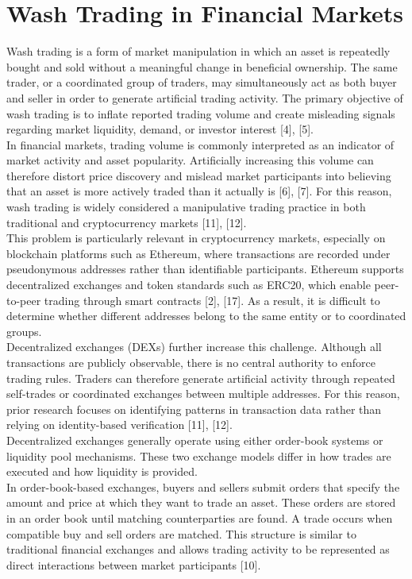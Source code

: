 \documentclass[language=english,thesis=bachelor,nosecondtitle,onesided,faculty=cb]{hsmw-thesis}
\begin{document}
	\section{Wash Trading in Financial Markets}
Wash trading is a form of market manipulation in which an asset is repeatedly bought and sold without a meaningful change in beneficial ownership. The same trader, or a coordinated group of traders, may simultaneously act as both buyer and seller in order to generate artificial trading activity. The primary objective of wash trading is to inflate reported trading volume and create misleading signals regarding market liquidity, demand, or investor interest [4], [5].\\
In financial markets, trading volume is commonly interpreted as an indicator of market activity and asset popularity. Artificially increasing this volume can therefore distort price discovery and mislead market participants into believing that an asset is more actively traded than it actually is [6], [7]. For this reason, wash trading is widely considered a manipulative trading practice in both traditional and cryptocurrency markets [11], [12].\\
This problem is particularly relevant in cryptocurrency markets, especially on blockchain platforms such as Ethereum, where transactions are recorded under pseudonymous addresses rather than identifiable participants. Ethereum supports decentralized exchanges and token standards such as ERC20, which enable peer-to-peer trading through smart contracts [2], [17]. As a result, it is difficult to determine whether different addresses belong to the same entity or to coordinated groups.\\
Decentralized exchanges (DEXs) further increase this challenge. Although all transactions are publicly observable, there is no central authority to enforce trading rules. Traders can therefore generate artificial activity through repeated self-trades or coordinated exchanges between multiple addresses. For this reason, prior research focuses on identifying patterns in transaction data rather than relying on identity-based verification [11], [12].\\
Decentralized exchanges generally operate using either order-book systems or liquidity pool mechanisms. These two exchange models differ in how trades are executed and how liquidity is provided.\\
In order-book-based exchanges, buyers and sellers submit orders that specify the amount and price at which they want to trade an asset. These orders are stored in an order book until matching counterparties are found. A trade occurs when compatible buy and sell orders are matched. This structure is similar to traditional financial exchanges and allows trading activity to be represented as direct interactions between market participants [10].\\
\end{document}

